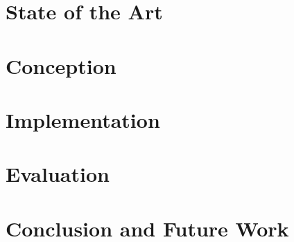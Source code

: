 \documentclass[english, BCOR=6mm, twoside=true, open=right]{tudscrreprt}
\begin{document}
\chapter{State of the Art}\label{chapter:state-of-the-art}



% 

\chapter{Conception}




\chapter{Implementation}



\chapter{Evaluation}



\chapter{Conclusion and Future Work}



\newpage
{}
\listoffigures

\newpage
{}
\listoftables

\newpage
{}
\lstlistoflistings







\end{document}
